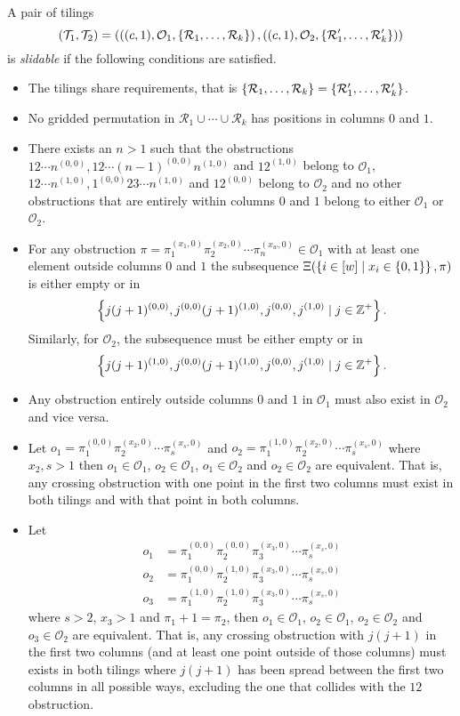 \begin{definition}\label{def:slidable}
A pair of tilings
\[
    (\mathcal{T}_1,\mathcal{T}_2) = \left(\left((c,1), \mathcal{O}_1, \left\{\mathcal{R}_1,\ldots,\mathcal{R}_k\right\}\right), \left((c,1), \mathcal{O}_2, \left\{\mathcal{R}'_1,\ldots,\mathcal{R}'_k\right\}\right)\right)
\]
is \emph{slidable} if the following conditions are satisfied.
\begin{itemize}
    \item The tilings share requirements, that is $\left\{\mathcal{R}_1,\ldots,\mathcal{R}_k\right\}=\left\{\mathcal{R}'_1,\ldots,\mathcal{R}'_k\right\}$.
    \item No gridded permutation in $\mathcal{R}_1 \cup \cdots \cup \mathcal{R}_k$ has positions in columns $0$ and $1$.
    \item There exists an $n>1$ such that the obstructions $12\cdots n^{(0,0)}, 12\cdots (n-1)^{(0,0)}n^{(1,0)}$ and $12^{(1,0)}$ belong to $\mathcal{O}_1$, $12\cdots n^{(1,0)}, 1^{(0,0)}23\cdots n^{(1,0)}$ and $12^{(0,0)}$ belong to $\mathcal{O}_2$ and no other obstructions that are entirely within columns $0$ and $1$ belong to either $\mathcal{O}_1$ or $\mathcal{O}_2$.
    \item For any obstruction $\pi = \pi_1^{(x_1,0)}\pi_2^{(x_2,0)}\cdots\pi_n^{(x_w,0)} \in \mathcal{O}_1$ with at least one element outside columns $0$ and $1$ the subsequence $\Xi(\left\{i \in [w] \mid x_i \in \left\{0,1\right\}\right\},\pi)$ is either empty or in 
    \[
         \left\{j(j+1)^{(0,0)}, j^{(0,0)}(j+1)^{(1,0)}, j^{(0,0)},j^{(1,0)} \mid j\in\mathbb{Z}^+\right\}.
    \]
    Similarly, for $\mathcal{O}_2$, the subsequence must be either empty or in 
    \[
         \left\{j(j+1)^{(1,0)}, j^{(0,0)}(j+1)^{(1,0)}, j^{(0,0)},j^{(1,0)} \mid j\in\mathbb{Z}^+\right\}.
    \]
    \item Any obstruction entirely outside columns $0$ and $1$ in $\mathcal{O}_1$ must also exist in $\mathcal{O}_2$ and vice versa.
    \item Let $o_1 = \pi_1^{(0,0)}\pi_2^{(x_2,0)}\cdots\pi_s^{(x_s,0)}$ and $o_2 = \pi_1^{(1,0)}\pi_2^{(x_2,0)}\cdots\pi_s^{(x_s,0)}$ where $x_2,s > 1$ then $o_1 \in \mathcal{O}_1$, $o_2 \in \mathcal{O}_1$, $o_1 \in \mathcal{O}_2$ and $o_2 \in \mathcal{O}_2$ are equivalent. That is, any crossing obstruction with one point in the first two columns must exist in both tilings and with that point in both columns.
    \item Let \begin{align*}o_1 &= \pi_1^{(0,0)}\pi_2^{(0,0)}\pi_3^{(x_3,0)}\cdots\pi_s^{(x_s,0)}\\o_2 &= \pi_1^{(0,0)}\pi_2^{(1,0)}\pi_3^{(x_3,0)}\cdots\pi_s^{(x_s,0)}\\o_3 &= \pi_1^{(1,0)}\pi_2^{(1,0)}\pi_3^{(x_3,0)}\cdots\pi_s^{(x_s,0)}\end{align*} where $s > 2$, $x_3 > 1$ and $\pi_1 + 1 = \pi_2$, then $o_1 \in \mathcal{O}_1$, $o_2 \in \mathcal{O}_1$, $o_2 \in \mathcal{O}_2$ and $o_3 \in \mathcal{O}_2$ are equivalent. That is, any crossing obstruction with $j(j+1)$ in the first two columns (and at least one point outside of those columns) must exists in both tilings where $j(j+1)$ has been spread between the first two columns in all possible ways, excluding the one that collides with the $12$ obstruction.

\end{itemize}
\end{definition}
